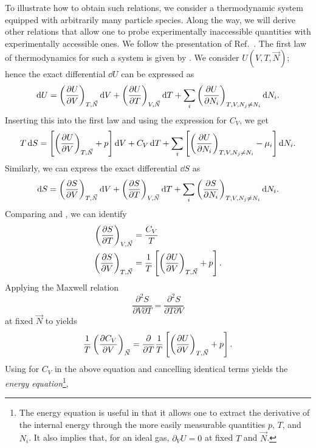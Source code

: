 To illustrate how to obtain such relations, we consider 
a thermodynamic system equipped with arbitrarily many particle species. 
Along the way, we will derive other relations that allow one to probe
experimentally inaccessible quantities with experimentally accessible ones.
We follow the presentation of Ref.~\cite{huang_introduction_2001}.
The first law of thermodynamics for such a system is given by
. We consider $U(V,T,\vec{N})$; hence the exact differential 
$\dd U$ can be expressed as
\begin{equation}
\dd{U} = \left(\pdv{U}{V}\right)_{T,\vec{N}}\dd{V}
+ \left(\pdv{U}{T}\right)_{V,\vec{N}}\dd{T}
+ \sum_i \left(\pdv{U}{N_i}\right)_{T,V,N_j\neq N_i}\dd N_i.
\end{equation}
Inserting this into the first law and using the expression
 for $C_V$, we get
\begin{equation}\label{eq:maxDeriv1}
T\dd{S}=
\left[ \left(\pdv{U}{V}\right)_{T,\vec{N}} +p\right]\dd{V}
+ C_V \dd{T}
+ \sum_i \left[\left(\pdv{U}{N_i}\right)_{T,V,N_j\neq N_i}-\mu_i\right]\dd N_i.
\end{equation}
Similarly, we can express the exact differential $\dd{S}$ as
\begin{equation}\label{eq:maxDeriv2}
\dd{S} = \left(\pdv{S}{V}\right)_{T,\vec{N}}\dd{V}
+ \left(\pdv{S}{T}\right)_{V,\vec{N}}\dd{T}
+ \sum_i \left(\pdv{S}{N_i}\right)_{T,V,N_j\neq N_i}\dd N_i.
\end{equation}
Comparing  and ,
we can identify
\begin{equation}\begin{aligned}\label{eq:maxDeriv3}
\left(\pdv{S}{T}\right)_{V,\vec{N}}&=\frac{C_V}{T}\\
\left(\pdv{S}{V}\right)_{T,\vec{N}}&=
\frac{1}{T}\left[\left(\pdv{U}{V}\right)_{T,\vec{N}} +p\right].
\end{aligned}\end{equation}
Applying the Maxwell relation
\begin{equation}
\frac{\partial^2 S}{\partial V\partial T}
=\frac{\partial^2 S}{\partial T\partial V}
\end{equation}
at fixed $\vec{N}$ to  yields
\begin{equation}
\frac{1}{T}\left(\pdv{C_V}{V}\right)_{\vec{N}}=
\frac{\partial}{\partial T}
\frac{1}{T}\left[\left(\pdv{U}{V}\right)_{T,\vec{N}} +p\right].
\end{equation}
Using  for $C_V$ in the above equation and 
cancelling identical terms yields the {\it energy equation}\footnote{The energy equation is useful in that it allows one to
extract the derivative of the internal energy through the more easily measurable
quantities $p$, $T$, and $N_i$. It also implies that, for an ideal gas,
$\partial_V U=0$ at fixed $T$ and $\vec{N}$.},

